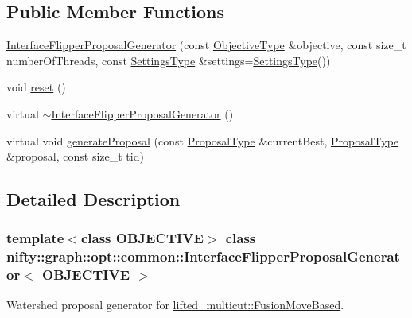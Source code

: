 \subsection*{Public Member Functions}
\begin{DoxyCompactItemize}
\item 
\hyperlink{classnifty_1_1graph_1_1opt_1_1common_1_1InterfaceFlipperProposalGenerator_af23d1f15bbc9a3d5b7463a1231db8e40}{Interface\+Flipper\+Proposal\+Generator} (const \hyperlink{classnifty_1_1graph_1_1opt_1_1common_1_1InterfaceFlipperProposalGenerator_a9dcf430ac057ae5144895c5bdf547086}{Objective\+Type} \&objective, const size\+\_\+t number\+Of\+Threads, const \hyperlink{structnifty_1_1graph_1_1opt_1_1common_1_1InterfaceFlipperProposalGenerator_1_1SettingsType}{Settings\+Type} \&settings=\hyperlink{structnifty_1_1graph_1_1opt_1_1common_1_1InterfaceFlipperProposalGenerator_1_1SettingsType}{Settings\+Type}())
\item 
void \hyperlink{classnifty_1_1graph_1_1opt_1_1common_1_1InterfaceFlipperProposalGenerator_a73064df4f691b0f2783085ecb9d03102}{reset} ()
\item 
virtual \hyperlink{classnifty_1_1graph_1_1opt_1_1common_1_1InterfaceFlipperProposalGenerator_a0c68a92a7b6b00b620151ed1c506057b}{$\sim$\+Interface\+Flipper\+Proposal\+Generator} ()
\item 
virtual void \hyperlink{classnifty_1_1graph_1_1opt_1_1common_1_1InterfaceFlipperProposalGenerator_acbd07354ba5ba08aa91fbce29c465776}{generate\+Proposal} (const \hyperlink{classnifty_1_1graph_1_1opt_1_1common_1_1InterfaceFlipperProposalGenerator_aced6351cf8e65e436e1efedd8f5ed089}{Proposal\+Type} \&current\+Best, \hyperlink{classnifty_1_1graph_1_1opt_1_1common_1_1InterfaceFlipperProposalGenerator_aced6351cf8e65e436e1efedd8f5ed089}{Proposal\+Type} \&proposal, const size\+\_\+t tid)
\end{DoxyCompactItemize}


\subsection{Detailed Description}
\subsubsection*{template$<$class O\+B\+J\+E\+C\+T\+I\+VE$>$\newline
class nifty\+::graph\+::opt\+::common\+::\+Interface\+Flipper\+Proposal\+Generator$<$ O\+B\+J\+E\+C\+T\+I\+V\+E $>$}

Watershed proposal generator for \hyperlink{classnifty_1_1graph_1_1opt_1_1lifted__multicut_1_1FusionMoveBased}{lifted\+\_\+multicut\+::\+Fusion\+Move\+Based}. 


